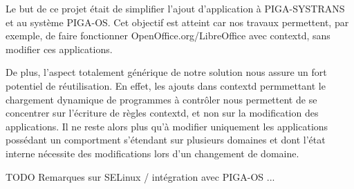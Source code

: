 \documentclass[pdftex,a4paper,titlepage,11pt]{article}
\begin{document}
Le but de ce projet était de simplifier l'ajout d'application à PIGA-SYSTRANS et au système PIGA-OS. Cet objectif est atteint car nos travaux permettent, par exemple, de faire fonctionner OpenOffice.org/LibreOffice avec contextd, sans modifier ces applications.

De plus, l'aspect totalement générique de notre solution nous assure un fort potentiel de réutilisation. En effet, les ajouts dans contextd permmettant le chargement dynamique de programmes à contrôler nous permettent de se concentrer sur l'écriture de règles contextd, et non sur la modification des applications. Il ne reste alors plus qu'à modifier uniquement les applications possédant un comportment s'étendant sur plusieurs domaines et dont l'état interne nécessite des modifications lors d'un changement de domaine.

TODO Remarques sur SELinux / intégration avec PIGA-OS ...


\newpage
\end{document}
